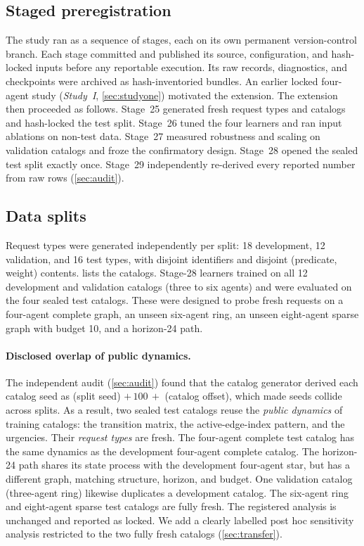 \documentclass[11pt,a4paper]{article}
\begin{document}
\subsection{Staged preregistration}\label{sec:stages}

The study ran as a sequence of stages, each on its own permanent version-control branch. Each stage committed and published its source, configuration, and hash-locked inputs before any reportable execution. Its raw records, diagnostics, and checkpoints were archived as hash-inventoried bundles. An earlier locked four-agent study (\emph{Study~I}, \cref{sec:studyone}) motivated the extension. The extension then proceeded as follows. Stage~25 generated fresh request types and catalogs and hash-locked the test split. Stage~26 tuned the four learners and ran input ablations on non-test data. Stage~27 measured robustness and scaling on validation catalogs and froze the confirmatory design. Stage~28 opened the sealed test split exactly once. Stage~29 independently re-derived every reported number from raw rows (\cref{sec:audit}).

\subsection{Data splits}\label{sec:splits}

Request types were generated independently per split: 18 development, 12 validation, and 16 test types, with disjoint identifiers and disjoint (predicate, weight) contents.  lists the catalogs. Stage-28 learners trained on all 12 development and validation catalogs (three to six agents) and were evaluated on the four sealed test catalogs. These were designed to probe fresh requests on a four-agent complete graph, an unseen six-agent ring, an unseen eight-agent sparse graph with budget 10, and a horizon-24 path.

\paragraph{Disclosed overlap of public dynamics.} The independent audit (\cref{sec:audit}) found that the catalog generator derived each catalog seed as (split seed) $+\,100\,+$ (catalog offset), which made seeds collide across splits. As a result, two sealed test catalogs reuse the \emph{public dynamics} of training catalogs: the transition matrix, the active-edge-index pattern, and the urgencies. Their \emph{request types} are fresh. The four-agent complete test catalog has the same dynamics as the development four-agent complete catalog. The horizon-24 path shares its state process with the development four-agent star, but has a different graph, matching structure, horizon, and budget. One validation catalog (three-agent ring) likewise duplicates a development catalog. The six-agent ring and eight-agent sparse test catalogs are fully fresh. The registered analysis is unchanged and reported as locked. We add a clearly labelled post hoc sensitivity analysis restricted to the two fully fresh catalogs (\cref{sec:transfer}).
\end{document}
